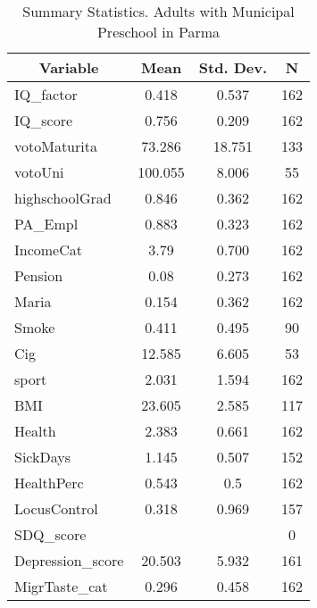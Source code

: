 
\begin{table}[htbp]\centering \caption{Summary Statistics. Adults with Municipal Preschool in Parma \label{bothAdultmaternaMuniParma}}
\begin{tabular}{l c c  c}\hline\hline
\multicolumn{1}{c}{\textbf{Variable}} & \textbf{Mean}
 & \textbf{Std. Dev.} & \textbf{N}\\ \hline
IQ\_factor & 0.418 & 0.537  & 162\\
IQ\_score & 0.756 & 0.209  & 162\\
votoMaturita & 73.286 & 18.751  & 133\\
votoUni & 100.055 & 8.006  & 55\\
highschoolGrad & 0.846 & 0.362  & 162\\
PA\_Empl & 0.883 & 0.323  & 162\\
IncomeCat & 3.79 & 0.700  & 162\\
Pension & 0.08 & 0.273  & 162\\
Maria & 0.154 & 0.362  & 162\\
Smoke & 0.411 & 0.495  & 90\\
Cig & 12.585 & 6.605  & 53\\
sport & 2.031 & 1.594  & 162\\
BMI & 23.605 & 2.585  & 117\\
Health & 2.383 & 0.661  & 162\\
SickDays & 1.145 & 0.507  & 152\\
HealthPerc & 0.543 & 0.5  & 162\\
LocusControl & 0.318 & 0.969  & 157\\
SDQ\_score &  &   & 0\\
Depression\_score & 20.503 & 5.932  & 161\\
MigrTaste\_cat & 0.296 & 0.458  & 162\\
\hline\end{tabular}
\end{table}

